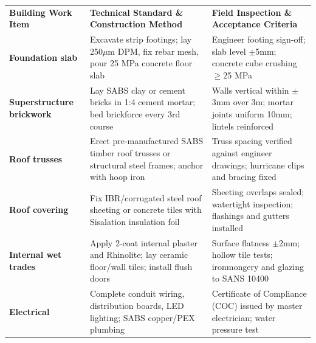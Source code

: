 {\fontsize{7.7pt}{9.8pt}\selectfont
\renewcommand{\arraystretch}{1.23}
\noindent
\begin{tabularx}{\textwidth}{@{}p{3.3cm} p{6.6cm} X@{}}
\rowcolor{mhnavy}
{\color{white}\bfseries Building Work Item} & {\color{white}\bfseries Technical Standard \& Construction Method} & {\color{white}\bfseries Field Inspection \& Acceptance Criteria} \\
\rowcolor{mhbluelight}
\bfseries Foundation slab & Excavate strip footings; lay 250$\mu$m DPM, fix rebar mesh, pour 25 MPa concrete floor slab & Engineer footing sign-off; slab level $\pm$5mm; concrete cube crushing $\ge$25 MPa \\
\bfseries Superstructure brickwork & Lay SABS clay or cement bricks in 1:4 cement mortar; bed brickforce every 3rd course & Walls vertical within $\pm$3mm over 3m; mortar joints uniform 10mm; lintels reinforced \\
\rowcolor{mhbluelight}
\bfseries Roof trusses & Erect pre-manufactured SABS timber roof trusses or structural steel frames; anchor with hoop iron & Truss spacing verified against engineer drawings; hurricane clips and bracing fixed \\
\bfseries Roof covering & Fix IBR/corrugated steel roof sheeting or concrete tiles with Sisalation insulation foil & Sheeting overlaps sealed; watertight inspection; flashings and gutters installed \\
\rowcolor{mhbluelight}
\bfseries Internal wet trades & Apply 2-coat internal plaster and Rhinolite; lay ceramic floor/wall tiles; install flush doors & Surface flatness $\pm$2mm; hollow tile tests; ironmongery and glazing to SANS 10400 \\
\bfseries Electrical & Complete conduit wiring, distribution boards, LED lighting; SABS copper/PEX plumbing & Certificate of Compliance (COC) issued by master electrician; water pressure test \\
\end{tabularx}
\renewcommand{\arraystretch}{1}
}

\vfill

